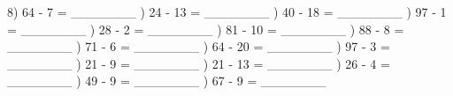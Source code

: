 \documentclass{article}%
\begin{document}
8) 64 {-} 7 = \_\_\_\_\_\_\_%
\newline%
\newline%
) 24 {-} 13 = \_\_\_\_\_\_\_%
\newline%
\newline%
) 40 {-} 18 = \_\_\_\_\_\_\_%
\newline%
\newline%
) 97 {-} 1 = \_\_\_\_\_\_\_%
\newline%
\newline%
) 28 {-} 2 = \_\_\_\_\_\_\_%
\newline%
\newline%
) 81 {-} 10 = \_\_\_\_\_\_\_%
\newline%
\newline%
) 88 {-} 8 = \_\_\_\_\_\_\_%
\newline%
\newline%
) 71 {-} 6 = \_\_\_\_\_\_\_%
\newline%
\newline%
) 64 {-} 20 = \_\_\_\_\_\_\_%
\newline%
\newline%
) 97 {-} 3 = \_\_\_\_\_\_\_%
\newline%
\newline%
) 21 {-} 9 = \_\_\_\_\_\_\_%
\newline%
\newline%
) 21 {-} 13 = \_\_\_\_\_\_\_%
\newline%
\newline%
) 26 {-} 4 = \_\_\_\_\_\_\_%
\newline%
\newline%
) 49 {-} 9 = \_\_\_\_\_\_\_%
\newline%
\newline%
) 67 {-} 9 = \_\_\_\_\_\_\_%
\newline%
\end{document}
